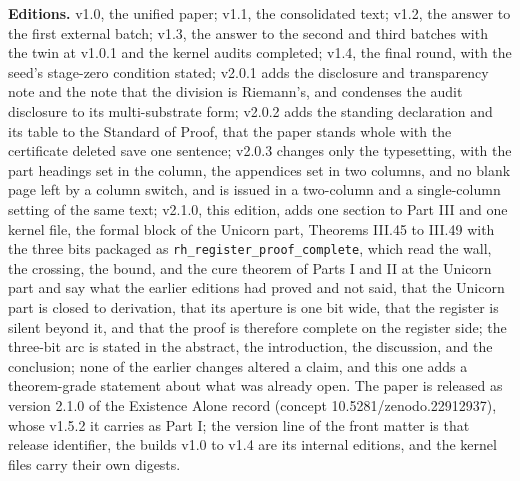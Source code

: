 \documentclass[10pt,twocolumn]{article}
\begin{document}
\textbf{Editions.} v1.0, the unified paper; v1.1, the consolidated text;
v1.2, the answer to the first external batch; v1.3, the answer to the
second and third batches with the twin at v1.0.1 and the kernel audits
completed; v1.4, the final round, with the seed's stage-zero condition
stated; v2.0.1 adds the disclosure and transparency note and the note
that the division is Riemann's, and condenses the audit disclosure to
its multi-substrate form; v2.0.2 adds the standing declaration and its
table to the Standard of Proof, that the paper stands whole with the
certificate deleted save one sentence; v2.0.3 changes only the
typesetting, with the part headings set in the column, the appendices
set in two columns, and no blank page left by a column switch, and is
issued in a two-column and a single-column setting of the same text;
v2.1.0, this edition, adds one section to Part III and one kernel file,
the formal block of the Unicorn part, Theorems III.45 to III.49 with the
three bits packaged as \texttt{rh\_register\_proof\_complete}, which
read the wall, the crossing, the bound, and the cure theorem of Parts I
and II at the Unicorn part and say what the earlier editions had proved
and not said, that the Unicorn part is closed to derivation, that its
aperture is one bit wide, that the register is silent beyond it, and
that the proof is therefore complete on the register side; the three-bit
arc is stated in the abstract, the introduction, the discussion, and the
conclusion; none of the earlier changes altered a claim, and this one
adds a theorem-grade statement about what was already open. The paper is
released as version 2.1.0 of the Existence Alone record (concept
10.5281/zenodo.22912937), whose v1.5.2 it carries as Part I; the version
line of the front matter is that release identifier, the builds v1.0 to
v1.4 are its internal editions, and the kernel files carry their own
digests.
\end{document}
